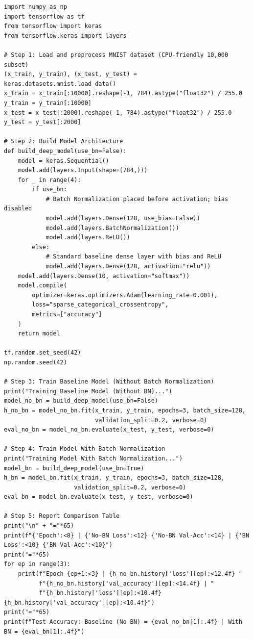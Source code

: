 \documentclass[12pt,a4paper]{article}
\begin{document}
\begin{lstlisting}
import numpy as np
import tensorflow as tf
from tensorflow import keras
from tensorflow.keras import layers

# Step 1: Load and preprocess MNIST dataset (CPU-friendly 10,000 subset)
(x_train, y_train), (x_test, y_test) = keras.datasets.mnist.load_data()
x_train = x_train[:10000].reshape(-1, 784).astype("float32") / 255.0
y_train = y_train[:10000]
x_test = x_test[:2000].reshape(-1, 784).astype("float32") / 255.0
y_test = y_test[:2000]

# Step 2: Build Model Architecture
def build_deep_model(use_bn=False):
    model = keras.Sequential()
    model.add(layers.Input(shape=(784,)))
    for _ in range(4):
        if use_bn:
            # Batch Normalization placed before activation; bias disabled
            model.add(layers.Dense(128, use_bias=False))
            model.add(layers.BatchNormalization())
            model.add(layers.ReLU())
        else:
            # Standard baseline dense layer with bias and ReLU
            model.add(layers.Dense(128, activation="relu"))
    model.add(layers.Dense(10, activation="softmax"))
    model.compile(
        optimizer=keras.optimizers.Adam(learning_rate=0.001),
        loss="sparse_categorical_crossentropy",
        metrics=["accuracy"]
    )
    return model

tf.random.set_seed(42)
np.random.seed(42)

# Step 3: Train Baseline Model (Without Batch Normalization)
print("Training Baseline Model (Without BN)...")
model_no_bn = build_deep_model(use_bn=False)
h_no_bn = model_no_bn.fit(x_train, y_train, epochs=3, batch_size=128, 
                          validation_split=0.2, verbose=0)
eval_no_bn = model_no_bn.evaluate(x_test, y_test, verbose=0)

# Step 4: Train Model With Batch Normalization
print("Training Model With Batch Normalization...")
model_bn = build_deep_model(use_bn=True)
h_bn = model_bn.fit(x_train, y_train, epochs=3, batch_size=128, 
                    validation_split=0.2, verbose=0)
eval_bn = model_bn.evaluate(x_test, y_test, verbose=0)

# Step 5: Report Comparison Table
print("\n" + "="*65)
print(f"{'Epoch':<8} | {'No-BN Loss':<12} {'No-BN Val-Acc':<14} | {'BN Loss':<10} {'BN Val-Acc':<10}")
print("="*65)
for ep in range(3):
    print(f"Epoch {ep+1:<3} | {h_no_bn.history['loss'][ep]:<12.4f} "
          f"{h_no_bn.history['val_accuracy'][ep]:<14.4f} | "
          f"{h_bn.history['loss'][ep]:<10.4f} {h_bn.history['val_accuracy'][ep]:<10.4f}")
print("="*65)
print(f"Test Accuracy: Baseline (No BN) = {eval_no_bn[1]:.4f} | With BN = {eval_bn[1]:.4f}")
\end{lstlisting}
\end{document}
